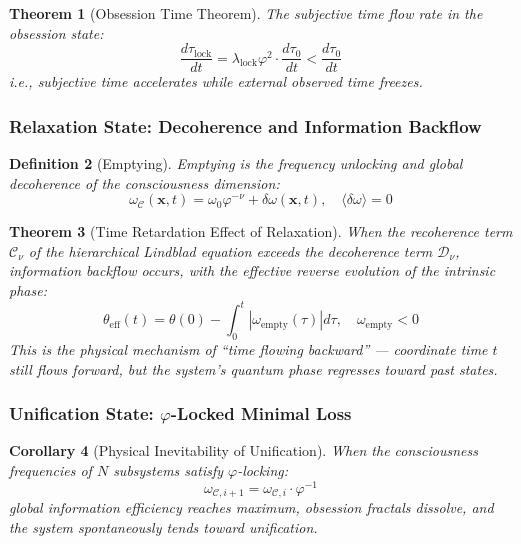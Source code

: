 \documentclass[12pt,a4paper,twocolumn]{article}
\renewcommand{\phi}{\varphi}
\newtheorem{theorem}{Theorem}[section]
\newtheorem{corollary}[theorem]{Corollary}
\newtheorem{definition}[theorem]{Definition}
\begin{document}
\begin{theorem}[Obsession Time Theorem]
The subjective time flow rate in the obsession state:
\begin{equation}
\frac{d\tau_{\text{lock}}}{dt} = \lambda_{\text{lock}}\phi^2 \cdot \frac{d\tau_0}{dt} < \frac{d\tau_0}{dt}
\end{equation}
i.e., subjective time accelerates while external observed time freezes.
\end{theorem}

\subsubsection{Relaxation State: Decoherence and Information Backflow}

\begin{definition}[Emptying]
Emptying is the frequency unlocking and global decoherence of the consciousness dimension:
\begin{equation}
\omega_{\mathcal{C}}(\mathbf{x},t) = \omega_0\phi^{-\nu} + \delta\omega(\mathbf{x},t), \quad \langle\delta\omega\rangle=0
\end{equation}
\end{definition}

\begin{theorem}[Time Retardation Effect of Relaxation]
When the recoherence term $\mathcal{C}_\nu$ of the hierarchical Lindblad equation exceeds the decoherence term $\mathcal{D}_\nu$, information backflow occurs, with the effective reverse evolution of the intrinsic phase:
\begin{equation}
\theta_{\text{eff}}(t) = \theta(0) - \int_0^t |\omega_{\text{empty}}(\tau)|d\tau, \quad \omega_{\text{empty}}<0
\end{equation}
This is the physical mechanism of ``time flowing backward'' --- coordinate time $t$ still flows forward, but the system's quantum phase regresses toward past states.
\end{theorem}

\subsubsection{Unification State: $\phi$-Locked Minimal Loss}

\begin{corollary}[Physical Inevitability of Unification]
When the consciousness frequencies of $N$ subsystems satisfy $\phi$-locking:
\begin{equation}
\omega_{\mathcal{C},i+1} = \omega_{\mathcal{C},i} \cdot \phi^{-1}
\end{equation}
global information efficiency reaches maximum, obsession fractals dissolve, and the system spontaneously tends toward unification.
\end{corollary}
\end{document}
